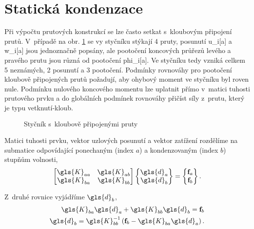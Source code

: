 \section{Statická kondenzace}

Při výpočtu prutových konstrukcí se lze často setkat s~kloubovým připojení prutů. V~případě na obr. \ref{fig:node_phis} se vy styčníku stýkají 4 pruty, posunutí \gls{u_i}[a] a \gls{w_i}[a] jsou jednoznačně popsány, ale pootočení koncových průřezů levého a pravého prutu jsou různá od pootočení \gls{phi_i}[a]. Ve styčníku tedy vzniká celkem 5 neznámých, 2 posunutí a 3 pootočení. Podmínky rovnováhy pro pootočení kloubově připojených prutů požadují, aby ohybový moment ve styčníku byl roven nule. Podmínku nulového koncového momentu lze uplatnit přímo v~matici tuhosti prutového prvku a do globálních podmínek rovnováhy přičíst síly z~prutu, který je typu vetknutí-kloub.

\begin{figure}[H]
    
    \caption{Styčník s~kloubově připojenými pruty}
    \label{fig:node_phis}
\end{figure}

Matici tuhosti prvku, vektor uzlových posunutí a vektor zatížení rozdělíme na submatice odpovídající ponechaným (index $a$) a kondenzovaným (index $b$) stupňům volnosti,
\begin{equation}
    \begin{bmatrix}
        \gls{K}_{aa} & \gls{K}_{ab} \\
        \gls{K}_{ba} & \gls{K}_{bb}
    \end{bmatrix}
    \begin{Bmatrix}
        \gls{d}_a \\
        \gls{d}_b
    \end{Bmatrix}
    =
    \begin{Bmatrix}
        \matr{f}_a \\
        \matr{f}_b
    \end{Bmatrix}.
\end{equation}

Z~druhé rovnice vyjádříme $\gls{d}_{b}$,
\begin{equation}
    \begin{aligned}
        \gls{K}_{ba} \gls{d}_a + \gls{K}_{bb} \gls{d}_{b} = \matr{f}_b \\
        \gls{d}_{b} = \gls{K}_{bb}^{-1} \left( \matr{f}_{b} - \gls{K}_{ba} \gls{d}_a \right).
    \end{aligned}
\end{equation}

